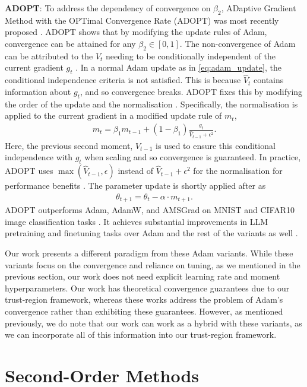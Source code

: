\textbf{ADOPT}: To address the dependency of convergence on $\beta_2$, ADaptive Gradient Method with the OPTimal Convergence Rate (ADOPT) was most recently proposed \citep{taniguchi2024adopt}. ADOPT shows that by modifying the update rules of Adam, convergence can be attained for any $\beta_2 \in [0, 1]$. The non-convergence of Adam can be attributed to the $V_t$ needing to be conditionally independent of the current gradient $g_t$ \citep{taniguchi2024adopt}. In a normal Adam update as in \cref{eq:adam_update}, the conditional independence criteria is not satisfied. This is because $\hat{V}_t$ contains information about $g_t$, and so convergence breaks. 
ADOPT fixes this by modifying the order of the update and the normalisation \citep{taniguchi2024adopt}. Specifically, the normalisation is applied to the current gradient in a modified update rule of $m_t$, 
\begin{align}
    m_t = \beta_1 m_{t-1} + (1 - \beta_1) \frac{g_t}{\hat{V}_{t-1} + \epsilon^2}.
\end{align}
Here, the previous second moment, $V_{t-1}$ is used to ensure this conditional independence with $g_t$ when scaling and so convergence is guaranteed. In practice, ADOPT uses $\max(\hat{V}_{t-1}, \epsilon)$ instead of $\hat{V}_{t-1} + \epsilon^2$ for the normalisation for performance benefits \citep{taniguchi2024adopt}. The parameter update is shortly applied after as
\begin{align}
    \theta_{t+1} = \theta_{t} - \alpha \cdot m_{t+1}.
\end{align}
ADOPT outperforms Adam, AdamW, and AMSGrad on MNIST and CIFAR10 image classification tasks \citep{taniguchi2024adopt}.
It achieves substantial improvements in LLM pretraining and finetuning tasks over Adam and the rest of the variants as well \citep{taniguchi2024adopt}. 

Our work presents a different paradigm from these Adam variants. While these variants focus on the convergence and reliance on tuning, as we mentioned in the previous section, our work does not need explicit learning rate and moment hyperparameters. Our work has theoretical convergence guarantees due to our trust-region framework, whereas these works address the problem of Adam's convergence rather than exhibiting these guarantees. However, as mentioned previously, we do note that our work can work as a hybrid with these variants, as we can incorporate all of this information into our trust-region framework.

\section{Second-Order Methods}
\label{sec:second_order_methods}

